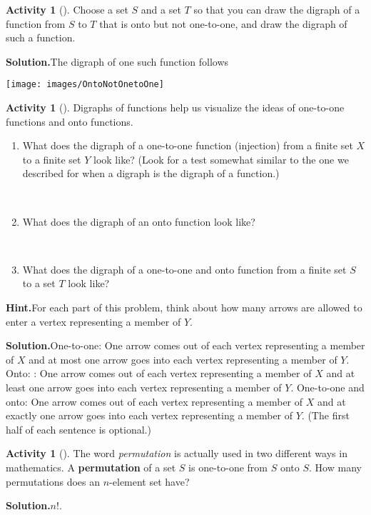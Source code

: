 \documentclass[10pt,]{book}
\newcommand{\terminology}[1]{\textbf{#1}}
\theoremstyle{plain}
\theoremstyle{definition}
\newtheorem{activity}[project]{Activity}
\numberwithin{equation}{chapter}
\begin{document}
\begin{activity}[]\label{activity-25}
Choose a set \(S\) and a set \(T\) so that you can draw the digraph of a function from \(S\) to \(T\) that is onto but not one-to-one, and draw the digraph of such a function.%
\par\medskip\noindent%
\textbf{Solution.}\quad The digraph of one such function follows%
\par
\texttt{[image: images/OntoNotOnetoOne]}
%
\end{activity}
\begin{activity}[]\label{activity-26}
Digraphs of functions help us visualize the ideas of one-to-one functions and onto functions.%
~\par
\begin{enumerate}[label=(\alph*)]
 \item What does the digraph of a one-to-one function (injection) from a finite set \(X\) to a finite set \(Y\) look like? (Look for a test somewhat similar to the one we described for when a digraph is the digraph of a function.)%

~\par
\item What does the digraph of an onto function look like?%

~\par
\item What does the digraph of a one-to-one and onto function from a finite set \(S\) to a set \(T\) look like?%

\end{enumerate}
\par\medskip\noindent%
\textbf{Hint.}\quad For each part of this problem, think about how many arrows are allowed to enter a vertex representing a member of \(Y\).%
\par\medskip\noindent%
\textbf{Solution.}\quad One-to-one: One arrow comes out of each vertex representing a member of \(X\) and at most one arrow goes into each vertex representing a member of \(Y\). Onto: : One arrow comes out of each vertex representing a member of \(X\) and at least one arrow goes into each vertex representing a member of \(Y\). One-to-one and onto: One arrow comes out of each vertex representing a member of \(X\) and at exactly one arrow goes into each vertex representing a member of \(Y\). (The first half of each sentence is optional.)%
\end{activity}
\begin{activity}[]\label{permutationasbijection}
The word \emph{permutation} is actually used in two different ways in mathematics. A \terminology{permutation} of a set \(S\) is one-to-one from \(S\) onto \(S\). How many permutations does an \(n\)-element set have?%
\par\medskip\noindent%
\textbf{Solution.}\quad \(n!\).%
\end{activity}
\end{document}
